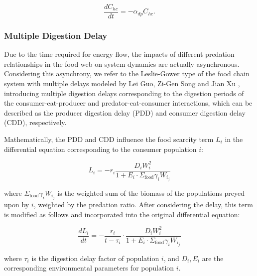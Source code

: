 \documentclass{HZNUMCM}
\begin{document}
        \begin{equation}
        \frac{dC_{hc}}{dt} = - \alpha_{dp} C_{hc}.
        \end{equation}
      
      \subsubsection{Multiple Digestion Delay}
        Due to the time required for energy flow, the impacts of different predation relationships in the food web on system dynamics are actually asynchronous. 
        Considering this asynchrony, we refer to the Leslie-Gower type of the food chain system with multiple delays modeled by Lei Guo, Zi-Gen Song and Jian Xu \cite{GUO20142850}, 
        introducing multiple digestion delays corresponding to the digestion periods of the consumer-eat-producer and predator-eat-consumer interactions, 
        which can be described as the producer digestion delay (PDD) and consumer digestion delay (CDD), respectively.

        Mathematically, the PDD and CDD influence the food scarcity term \(L_i\) in the differential equation corresponding to the consumer population \(i\):
        
        \begin{equation}
        L_i = -r_i \frac{D_i W_i^2}{1 + E_i \cdot \Sigma_{\text{food}} \gamma_i W_{i_j}}
        \end{equation}

        where \(\Sigma_{\text{food}} \gamma_i W_{i_j}\) is the weighted sum of the biomass of the populations preyed upon by \(i\), weighted by the predation ratio. 
        After considering the delay, this term is modified as follows and incorporated into the original differential equation:
        
        \begin{equation}
        \frac{dL_i}{dt} = -\frac{r_i}{t - \tau_i} \cdot \frac{D_i W_i^2}{1 + E_i \cdot \Sigma_{\text{food}} \gamma_i W_{i_j}}
        \end{equation}

        where \(\tau_i\) is the digestion delay factor of population \(i\), and \(D_i, E_i\) are the corresponding environmental parameters for population \(i\).
\end{document}
